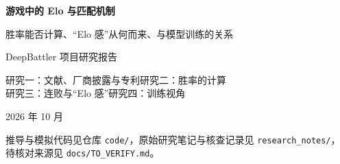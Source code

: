 \begin{titlepage}
\centering
\vspace*{3cm}
{\LARGE\bfseries 游戏中的 Elo 与匹配机制\par}
\vspace{0.8em}
{\Large 胜率能否计算、“Elo 感”从何而来、与模型训练的关系\par}
\vspace{2cm}
{\large DeepBattler 项目研究报告\par}
\vspace{0.6cm}
{\normalsize 研究一：文献、厂商披露与专利\quad 研究二：胜率的计算\\[0.3em]
研究三：连败与“Elo 感”\quad 研究四：训练视角\par}
\vspace{1.5cm}
{\large 2026 年 10 月\par}
\vfill
{\small 推导与模拟代码见仓库 \texttt{code/}，原始研究笔记与核查记录见 \texttt{research\_notes/}，\\待核对来源见 \texttt{docs/TO\_VERIFY.md}。\par}
\end{titlepage}
